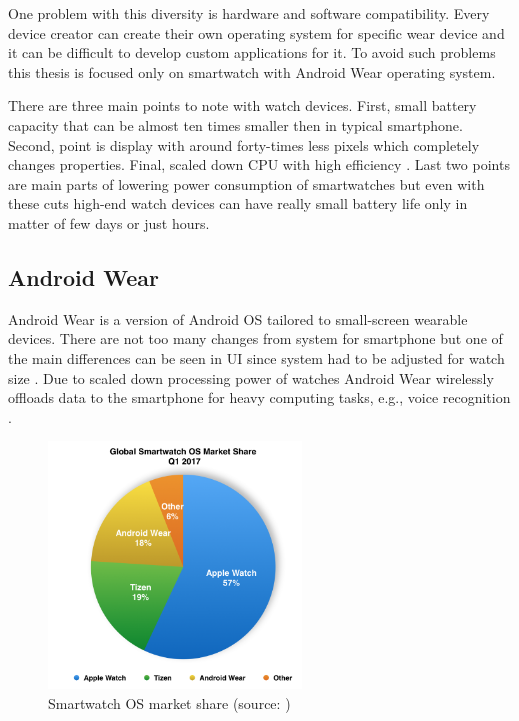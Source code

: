 One problem with this diversity is hardware and software compatibility. Every device creator can create their own operating system for specific wear device and it can be difficult to develop custom applications for it. To avoid such problems this thesis is focused only on smartwatch with Android Wear operating system. 

There are three main points to note with watch devices. First, small battery capacity that can be almost ten times smaller then in typical smartphone. Second, point is display with around forty-times less pixels which completely changes properties. Final, scaled down CPU with high efficiency \cite{UtCoAWO}. Last two points are main parts of lowering power consumption of smartwatches but even with these cuts high-end watch devices can have really small battery life only in matter of few days or just hours.

\subsection{Android Wear}\label{sec:AndroidWear}
Android Wear is a version of Android OS tailored to small-screen wearable devices. There are not too many changes from system for smartphone but one of the main differences can be seen in UI since system had to be adjusted for watch size \cite{CSUITW}. Due to scaled down processing power of watches Android Wear wirelessly offloads data to the smartphone for heavy computing tasks, e.g., voice recognition \cite{UCAW}.

\begin{figure}[H]
	\begin{centering}
		\includegraphics[width=0.6\textwidth]{img/wear_market_share}
		\par\end{centering}
	\caption{Smartwatch OS market share (source: \cite{TOAW})\label{fig:SmartwatchOSMarketShare}}
	\label{fig7}
\end{figure}

